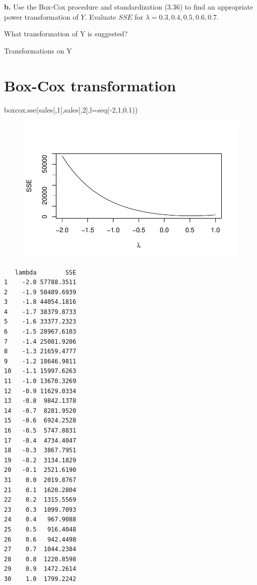 \documentclass[
  letterpaper,
  DIV=11,
  numbers=noendperiod]{scrartcl}
\newenvironment{Shaded}{\begin{snugshade}}{\end{snugshade}}
\newcommand{\AttributeTok}[1]{\textcolor[rgb]{0.40,0.45,0.13}{#1}}
\newcommand{\DecValTok}[1]{\textcolor[rgb]{0.68,0.00,0.00}{#1}}
\newcommand{\FloatTok}[1]{\textcolor[rgb]{0.68,0.00,0.00}{#1}}
\newcommand{\FunctionTok}[1]{\textcolor[rgb]{0.28,0.35,0.67}{#1}}
\newcommand{\NormalTok}[1]{\textcolor[rgb]{0.00,0.23,0.31}{#1}}
\newcommand{\SpecialCharTok}[1]{\textcolor[rgb]{0.37,0.37,0.37}{#1}}
\begin{document}
\textbf{b.} Use the Box-Cox procedure and standardization (3.36) to find
an appropriate power transformation of \(Y\). Evaluate \(SSE\) for
\(\lambda = 0.3, 0.4, 0.5, 0.6, 0.7\).

What transformation of Y is suggested?

Transformations on Y

\hypertarget{box-cox-transformation}{%
\section{Box-Cox transformation}\label{box-cox-transformation}}

\begin{Shaded}
\begin{Highlighting}[]
\FunctionTok{boxcox.sse}\NormalTok{(sales[,}\DecValTok{1}\NormalTok{],sales[,}\DecValTok{2}\NormalTok{],}\AttributeTok{l=}\FunctionTok{seq}\NormalTok{(}\SpecialCharTok{{-}}\DecValTok{2}\NormalTok{,}\DecValTok{1}\NormalTok{,}\FloatTok{0.1}\NormalTok{))}
\end{Highlighting}
\end{Shaded}

\begin{figure}[H]

{\centering \includegraphics{sta9700_ch3_hw_files/figure-pdf/unnamed-chunk-23-1.pdf}

}

\end{figure}

\begin{verbatim}
   lambda        SSE
1    -2.0 57788.3511
2    -1.9 50489.6939
3    -1.8 44054.1816
4    -1.7 38379.8733
5    -1.6 33377.2323
6    -1.5 28967.6103
7    -1.4 25081.9206
8    -1.3 21659.4777
9    -1.2 18646.9811
10   -1.1 15997.6263
11   -1.0 13670.3269
12   -0.9 11629.0334
13   -0.8  9842.1378
14   -0.7  8281.9520
15   -0.6  6924.2528
16   -0.5  5747.8831
17   -0.4  4734.4047
18   -0.3  3867.7951
19   -0.2  3134.1829
20   -0.1  2521.6190
31    0.0  2019.8767
21    0.1  1620.2804
22    0.2  1315.5569
23    0.3  1099.7093
24    0.4   967.9088
25    0.5   916.4048
26    0.6   942.4498
27    0.7  1044.2384
28    0.8  1220.8598
29    0.9  1472.2614
30    1.0  1799.2242
\end{verbatim}
\end{document}
